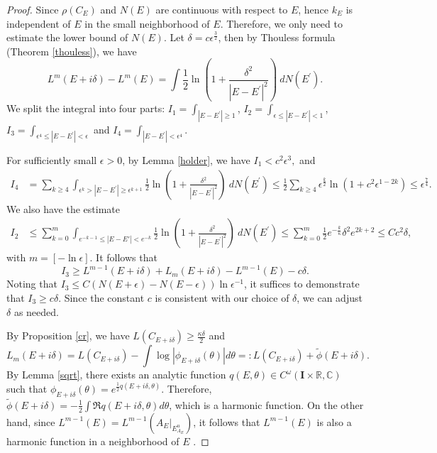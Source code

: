 \documentclass[11pt]{amsart}
\theoremstyle{remark}
\theoremstyle{definition}
\newcommand{\I}{{\mathbf I}}
\begin{document}
\begin{proof} 
Since $\rho(C_E)$ and $N(E)$ are  continuous  with respect to $E$, hence $k_E$ is independent of $E$ in the small neighborhood of $E$.  
Therefore, we only need to estimate the lower bound of $N(E).$
	Let $\delta=c \epsilon^{\frac{3}{2}}$,
 then by Thouless formula (Theorem \ref{thouless}), we have
	$$
	L^{m}(E+i\delta)-L^{m}(E)=\int \frac{1}{2} \ln (1+\frac{\delta^{2}}{\left|E-E^{\prime}\right|^{2}})\ d N\left(E^{\prime}\right).
	$$
	We split the integral into four parts: $I_{1}=\int_{\left|E-E^{\prime}\right|\geq1}$, $ I_{2}=\int_{\epsilon\le\left|E-E^{\prime}\right|<1}$, $I_{3}=\int_{\epsilon^{4}\le\left|E-E^{\prime}\right|<\epsilon}$ and $I_{4}=\int_{\left|E-E^{\prime}\right|<\epsilon^{4}}$.
	
	For sufficiently small $\epsilon>0$, by Lemma \ref{holder}, we have $I_1 <c^2\epsilon^3,$
	and
	\begin{equation*}
		\begin{split}
			I_{4}&=\sum_{k \geq 4} \int_{\epsilon^{k}>\left|E-E^{\prime}\right|\ge\epsilon^{k+1}}  \frac{1}{2}\ln (1+\frac{\delta^{2}}{\left|E-E^{\prime}\right|^{2}})\ d N\left(E^{\prime}\right) 
			\leq \frac{1}{2}\sum_{k \geq 4} \epsilon^{\frac{k}{2}} \ln (1+c^{2} \epsilon^{1-2 k})\leq \epsilon^{\frac{7}{4}}.
		\end{split}
	\end{equation*}
	We also have the estimate
	$$
	\begin{aligned} I_{2} & \leq \sum_{k=0}^{m} \int_{e^{-k-1}\le|E-E'|<e^{-k}} \frac{1}{2}\ln (1+\frac{\delta^{2}}{\left|E-E^{\prime}\right|^{2}})\ d N\left(E^{\prime}\right)\le\sum_{k=0}^{m}\frac{1}{2}e^{-\frac{k}{\kappa}}\delta^2e^{2k+2}\leq Cc^2\delta,\end{aligned}
	$$
	with $m=[-\ln \epsilon]$. 
	It follows that
	$$I_3\ge L^{m-1}(E+i\delta)+L_m(E+i\delta)-L^{m-1}(E)-c\delta.$$
    Noting that $ I_{3} \leq C(N(E+\epsilon) - N(E-\epsilon)) \ln \epsilon^{-1} $, it suffices to demonstrate that $ I_3 \geq c \delta $. Since the constant $ c $ is consistent with our choice of $ \delta $, we can adjust $ \delta $ as needed.

    By Proposition \ref{cr}, we have \( L(C_{E+i\delta}) \geq \frac{\kappa\delta}{2} \) and 
\[
L_m(E+i\delta) = L(C_{E+i\delta}) - \int \log \left| \phi_{E+i\delta}(\theta) \right| d\theta =: L(C_{E+i\delta}) + \tilde{\phi}(E+i\delta).
\]
By Lemma \ref{sqrt}, there exists an analytic function \( q(E,\theta) \in C^\omega(\I \times \mathbb{R}, \mathbb{C}) \) such that \( \phi_{E+i\delta}(\theta) = e^{\frac{1}{2}q(E+i\delta,\theta)} \). Therefore, \( \tilde{\phi}(E+i\delta) = -\frac{1}{2} \int \Re q(E+i\delta,\theta) d\theta \), which is a harmonic function.
On the other hand, since \( L^{m-1}(E) = L^{m-1}\left( A_E|_{E_{A_E}^u} \right) \), it follows that \( L^{m-1}(E) \) is also a harmonic function in a neighborhood of \( E \) \cite{positive,AJS}.
 

\end{proof}
\end{document}
